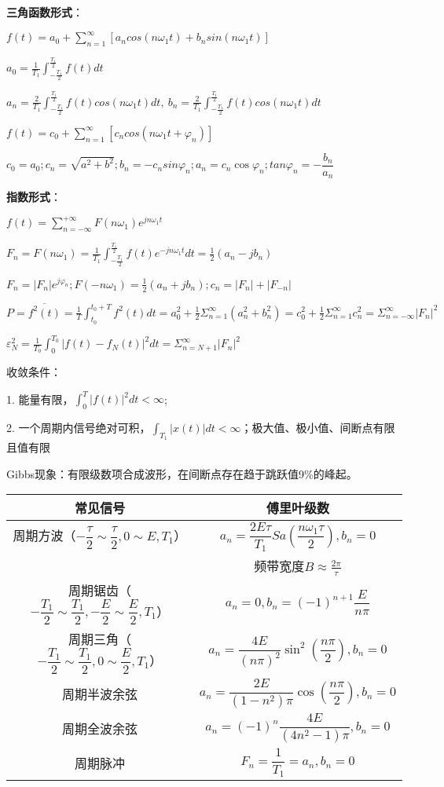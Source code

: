 \textbf{三角函数形式}：

$f(t)=a_0+\sum\limits_{n=1}^{\infty}[a_ncos(n\omega_1t)+b_nsin(n\omega_1t)]$

$a_0=\frac{1}{T_1}\int_{-\frac{T_1}{2}}^{\frac{T_1}{2}}f(t)dt$

$a_n=\frac{2}{T_1}\int_{-\frac{T_1}{2}}^{\frac{T_1}{2}}f(t)cos(n\omega_1t)dt,\ b_n=\frac{2}{T_1}\int_{-\frac{T_1}{2}}^{\frac{T_1}{2}}f(t)cos(n\omega_1t)dt$

$f(t)=c_0+\sum\limits_{n=1}^{\infty}[c_ncos(n\omega_1t + \varphi_n)]$

$c_0=a_0;c_n=\sqrt{a^2+b^2};b_n=-c_nsin\varphi_n;a_n=c_n\cos\varphi_n;tan\varphi_n=-\dfrac{b_n}{a_n}$

\textbf{指数形式}：

$f(t)=\sum\limits_{n=-\infty}^{+\infty}F(n\omega_1)e^{jn\omega_1t}$

$F_n=F(n\omega_1)=\frac{1}{T_1}\int_{-\frac{T_1}{2}}^{\frac{T_1}{2}}f(t)e^{-jn\omega_1t}dt=\frac{1}{2}(a_n-jb_n)$

$F_n = |F_n|e^{j\varphi_n} ; F(-n\omega_1) =\frac{1}{2}(a_n+jb_n); c_n = |F_n| + |F_{-n}|$

$P=\overline{f^2(t)}=\frac{1}{T}\int ^{t_0 + T} _{t_0} f^2(t)dt = a_0^2 + \frac{1}{2}\Sigma_{n=1}^{\infty}(a_n^2 + b_n^2) = c_0^2 + \frac{1}{2}\Sigma _{n=1}^{\infty}c_n^2 = \Sigma _{n=-\infty}^{\infty} |F_n|^2$

$\varepsilon_N^2=\frac{1}{T_0}\int ^{T_0} _0 |f(t)-f_N(t)|^2dt = \Sigma ^{\infty} _{n=N+1} |F_n|^2$

收敛条件：

1. 能量有限，$\int^T_0|f(t)|^2dt<\infty$;

2. 一个周期内信号绝对可积，$\int_{T_1}|x(t)|dt<\infty$；极大值、极小值、间断点有限且值有限

Gibbs现象：有限级数项合成波形，在间断点存在趋于跳跃值9\%的峰起。

\begin{tabular}{c|c}
常见信号 & 傅里叶级数 \\
\hline
周期方波（$-\dfrac{\tau}{2}\sim\dfrac{\tau}{2},0\sim E,T_1$） & $a_n=\dfrac{2E\tau}{T_1}Sa(\dfrac{n\omega_1\tau}{2}),b_n=0$ \\
 & 频带宽度$B\approx \frac{2\pi}{\tau}$ \\
\hline
周期锯齿（$-\dfrac{T_1}{2}\sim\dfrac{T_1}{2},-\dfrac{E}{2}\sim\dfrac{E}{2},T_1$） & $a_n=0,b_n=(-1)^{n+1}\dfrac{E}{n\pi}$ \\
\hline
周期三角（$-\dfrac{T_1}{2}\sim\dfrac{T_1}{2},0\sim\dfrac{E}{2},T_1$） & $a_n=\dfrac{4E}{(n\pi)^2}\sin^2(\dfrac{n\pi}{2}),b_n=0$ \\
\hline
周期半波余弦 & $a_n=\dfrac{2E}{(1-n^2)\pi}\cos(\dfrac{n\pi}{2}),b_n=0$ \\
\hline
周期全波余弦 & $a_n=(-1)^n\dfrac{4E}{(4n^2-1)\pi},b_n=0$ \\
\hline
周期脉冲 & $F_n=\dfrac{1}{T_1}=a_n,b_n=0$ \\
\end{tabular}

